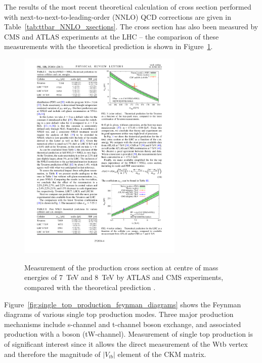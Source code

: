 The results of the most recent theoretical calculation of \ttbar cross section performed with
next-to-next-to-leading-order (NNLO) QCD corrections \autocite{NNLO_ttbar} are given in
Table~\ref{tab:ttbar_NNLO_xsections}. The cross section has also been measured by CMS and ATLAS experiments at the LHC
-- the comparison of these measurements with the theoretical prediction is shown in
Figure~\ref{fig:xsections_comparison_NNLO}.




\begin{figure}[!hbtp]
   \centering
   {\includegraphics[width=0.7\textwidth]{xsections_comparison_NNLO}}
   \caption[Measurement of the \ttbar production cross section]{Measurement of the \ttbar production cross section at
   centre of mass energies of \SI{7}{\TeV} and \SI{8}{\TeV} by ATLAS and CMS experiments, compared with the theoretical
   prediction \autocite{NNLO_ttbar}.}
   \label{fig:xsections_comparison_NNLO}
\end{figure}


Figure~\ref{fig:single_top_production_feynman_diagrams} shows the Feynman diagrams of various single top production
modes. Three major production mechanisms include s-channel and t-channel \W boson exchange, and associated production
with a \W boson (tW-channel). Measurement of single top production is of significant interest since it allows the direct
measurement of the Wtb vertex and therefore the magnitude of $|V_{tb}|$ element of the CKM matrix.

